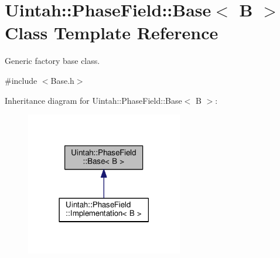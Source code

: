 \hypertarget{classUintah_1_1PhaseField_1_1Base}{}\section{Uintah\+:\+:Phase\+Field\+:\+:Base$<$ B $>$ Class Template Reference}
\label{classUintah_1_1PhaseField_1_1Base}


Generic factory base class.  




{\ttfamily \#include $<$Base.\+h$>$}



Inheritance diagram for Uintah\+:\+:Phase\+Field\+:\+:Base$<$ B $>$\+:\nopagebreak
\begin{figure}[H]
\begin{center}
\leavevmode
\includegraphics[width=194pt]{classUintah_1_1PhaseField_1_1Base__inherit__graph}
\end{center}
\end{figure}
